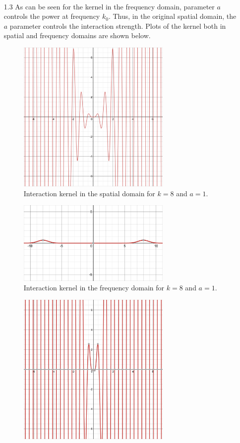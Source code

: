 \documentclass[12pt]{article}
\begin{document}
\begin{enumerate}
\begin{align*}
\end{align*}
\item[1.3] As can be seen for the kernel in the frequency domain, parameter $a$ controls the power at frequency $k_0$. Thus, in the original spatial domain, the $a$ parameter controls the interaction strength. 
Plots of the kernel both in spatial and frequency domains are shown below. 
\begin{figure}[H]
    \centering
    \includegraphics[width=0.7\textwidth]{./k8a1.png}
    \caption{Interaction kernel in the spatial domain for $k=8$ and $a=1$.}
\end{figure}
\begin{figure}[H]
    \centering
    \includegraphics[width=0.7\textwidth]{./a1.png}
    \caption{Interaction kernel in the frequency domain for $k=8$ and $a=1$.}
\end{figure}
\begin{figure}[H]
    \centering
    \includegraphics[width=0.7\textwidth]{./k8a8.png}

\end{figure}
\end{enumerate}
\end{document}
